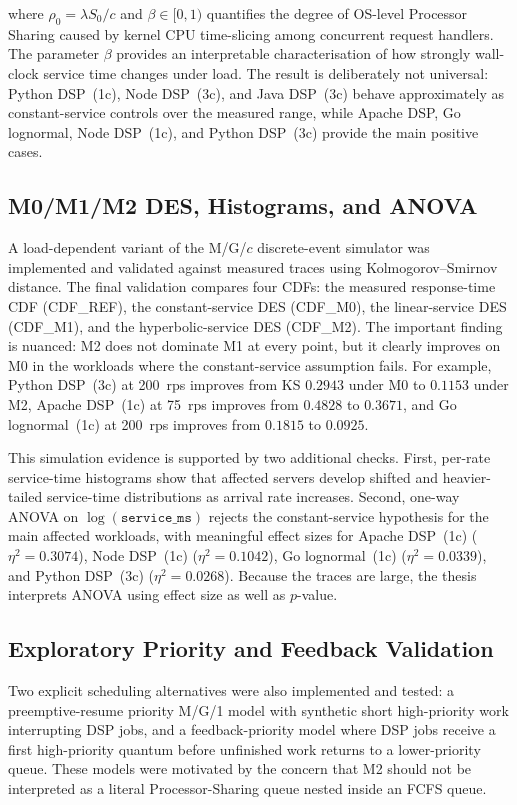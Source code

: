 where $\rho_0=\lambda S_0/c$ and $\beta \in [0, 1)$ quantifies the degree of OS-level Processor Sharing caused by kernel CPU time-slicing among concurrent request handlers. The parameter $\beta$ provides an interpretable characterisation of how strongly wall-clock service time changes under load. The result is deliberately not universal: Python DSP~(1c), Node DSP~(3c), and Java DSP~(3c) behave approximately as constant-service controls over the measured range, while Apache DSP, Go lognormal, Node DSP~(1c), and Python DSP~(3c) provide the main positive cases.

\subsection{M0/M1/M2 DES, Histograms, and ANOVA}

A load-dependent variant of the M/G/$c$ discrete-event simulator was implemented and validated against measured traces using Kolmogorov--Smirnov distance. The final validation compares four CDFs: the measured response-time CDF (CDF\_REF), the constant-service DES (CDF\_M0), the linear-service DES (CDF\_M1), and the hyperbolic-service DES (CDF\_M2). The important finding is nuanced: M2 does not dominate M1 at every point, but it clearly improves on M0 in the workloads where the constant-service assumption fails. For example, Python DSP~(3c) at 200~rps improves from KS $0.2943$ under M0 to $0.1153$ under M2, Apache DSP~(1c) at 75~rps improves from $0.4828$ to $0.3671$, and Go lognormal~(1c) at 200~rps improves from $0.1815$ to $0.0925$.

This simulation evidence is supported by two additional checks. First, per-rate service-time histograms show that affected servers develop shifted and heavier-tailed service-time distributions as arrival rate increases. Second, one-way ANOVA on $\log(\texttt{service\_ms})$ rejects the constant-service hypothesis for the main affected workloads, with meaningful effect sizes for Apache DSP~(1c) ($\eta^2=0.3074$), Node DSP~(1c) ($\eta^2=0.1042$), Go lognormal~(1c) ($\eta^2=0.0339$), and Python DSP~(3c) ($\eta^2=0.0268$). Because the traces are large, the thesis interprets ANOVA using effect size as well as $p$-value.

\subsection{Exploratory Priority and Feedback Validation}

Two explicit scheduling alternatives were also implemented and tested: a preemptive-resume priority M/G/1 model with synthetic short high-priority work interrupting DSP jobs, and a feedback-priority model where DSP jobs receive a first high-priority quantum before unfinished work returns to a lower-priority queue. These models were motivated by the concern that M2 should not be interpreted as a literal Processor-Sharing queue nested inside an FCFS queue.

